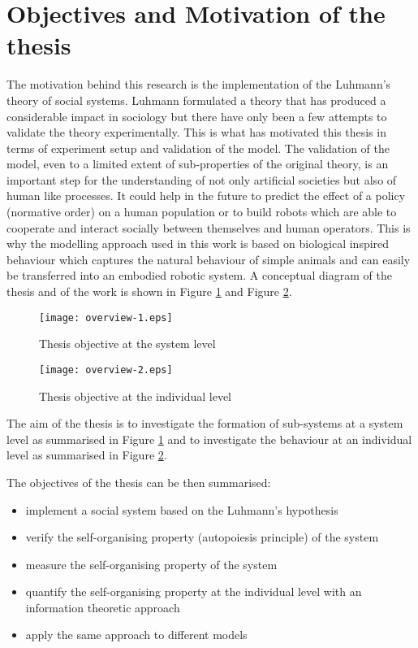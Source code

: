 \section{Objectives and Motivation of the thesis}
The motivation behind this research is the implementation of the Luhmann's
theory of social systems.
Luhmann formulated a theory that has produced a considerable
impact in sociology but there have only been a few attempts to validate
the theory experimentally.
This is what has motivated this thesis in terms of experiment setup and
validation of the model.
The validation of the model, even to a limited extent of sub-properties of the
original theory, is an important step for the understanding of not only
artificial societies but also of human like processes.
It could help in the future to predict the effect of a policy (normative order)
on a human population or to build robots which are able to cooperate and
interact socially between themselves and human operators.
This is why the modelling approach used in this work is based on biological
inspired behaviour which captures the natural behaviour of simple animals and
can easily be transferred into an embodied robotic system.
A conceptual diagram of the thesis and of the work is shown in 
Figure \ref{fig:overview-1} and Figure \ref{fig:overview-2}.

\begin{figure}[htbp]
\begin{center}
\texttt{[image: overview-1.eps]}
\end{center}
\small{
\caption[Thesis research aim system]{Thesis objective at the system level \label{fig:overview-1}}}
\end{figure}

\begin{figure}[htbp]
\begin{center}
\texttt{[image: overview-2.eps]}
\end{center}
\small{
\caption[Thesis research aim individual]{Thesis objective at the individual level \label{fig:overview-2}}}
\end{figure}
The aim of the thesis is to investigate the formation of sub-systems at a
system level as summarised in Figure \ref{fig:overview-1} and to
investigate the behaviour at an individual level as summarised in Figure \ref{fig:overview-2}.

The objectives of the thesis can be then summarised:
\begin{itemize}
\item implement a social system based on the Luhmann's hypothesis
\item verify the self-organising property (autopoiesis principle) of the system
\item measure the self-organising property of the system
\item quantify the self-organising property at the individual level with an
information theoretic approach
\item apply the same approach to different models
\end{itemize}

